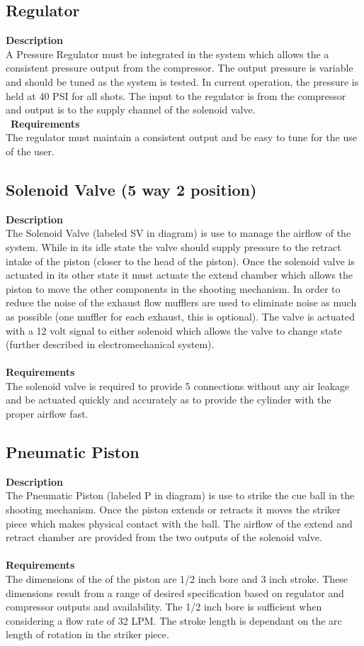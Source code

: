 \documentclass[titlepage]{article}
\begin{document}
\subsection{Regulator}
\textbf{Description}\\
A Pressure Regulator must be integrated in the system which allows the a consistent pressure output from the compressor. The output pressure is variable and should be tuned as the system is tested. In current operation, the pressure is held at 40 PSI for all shots. The input to the regulator is from the compressor and output is to the supply channel of the solenoid valve.\\\
\textbf{Requirements}\\
The regulator must maintain a consistent output and be easy to tune for the use of the user. 

\subsection{Solenoid Valve (5 way 2 position)}
\textbf{Description}\\
The Solenoid Valve (labeled SV in diagram) is use to manage the airflow of the system. While in its idle state the valve should supply pressure to the retract intake of the piston (closer to the head of the piston). Once the solenoid valve is actuated in its other state it must actuate the extend chamber which allows the piston to move the other components in the shooting mechanism. In order to reduce the noise of the exhaust flow mufflers are used to eliminate noise as much as possible (one muffler for each exhaust, this is optional). The valve is actuated with a 12 volt signal to either solenoid which allows the valve to change state (further described in electromechanical system). \\~\\
\textbf{Requirements}\\
The solenoid valve is required to provide 5 connections without any air leakage and be actuated quickly and accurately as to provide the cylinder with the proper airflow fast.

\subsection{Pneumatic Piston}
\textbf{Description}\\
The Pneumatic Piston (labeled P in diagram) is use to strike the cue ball in the shooting mechanism. Once the piston extends or retracts it moves the striker piece which makes physical contact with the ball. The airflow of the extend and retract chamber are provided from the two outputs of the solenoid valve.\\~\\
\textbf{Requirements}\\
 The dimensions of the of the piston are 1/2 inch bore and 3 inch stroke. These dimensions result from a range of desired specification based on regulator and compressor outputs and availability. The 1/2 inch bore is sufficient when considering a flow rate of 32 LPM. The stroke length is dependant on the arc length of rotation in the striker piece.
\end{document}
